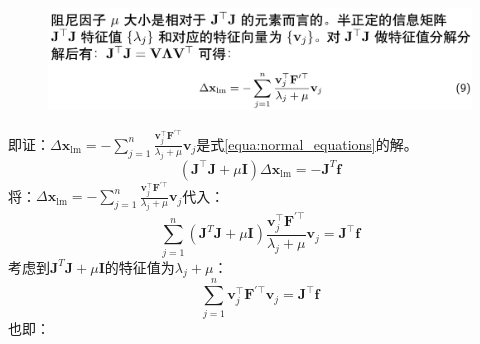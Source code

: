 \documentclass[oneside]{article}
\begin{document}
\begin{figure}[h]
    \centering
    \includegraphics[width=.8\linewidth]{figures/fig4.png}    
\end{figure}

即证：$\Delta \mathbf{x}_{\operatorname{lm}}=-\sum_{j=1}^{n} \frac{\mathbf{v}_{j}^{\top} \mathbf{F}^{\prime \top}}{\lambda_{j}+\mu} \mathbf{v}_{j}$是式\ref{equa:normal_equations}的解。
\begin{equation}
    (\mathbf{J}^\top\mathbf{J} + \mu \mathbf{I}) \Delta \mathbf{x}_{\operatorname{lm}} = - \mathbf{J} ^T  \mathbf{f}
    \label{equa:normal_equations}
\end{equation}
将：$\Delta \mathbf{x}_{\operatorname{lm}}=-\sum_{j=1}^{n} \frac{\mathbf{v}_{j}^{\top} \mathbf{F}^{\prime \top}}{\lambda_{j}+\mu} \mathbf{v}_{j}$代入：
\begin{equation}
    \sum_{j=1}^{n}(\mathbf{J}^T\mathbf{J} + \mu \mathbf{I})  \frac{\mathbf{v}_{j}^{\top} \mathbf{F}^{\prime \top}}{\lambda_{j}+\mu} \mathbf{v}_{j} = \mathbf{J} ^\top  \mathbf{f}
\end{equation}
考虑到$\mathbf{J}^T\mathbf{J} + \mu \mathbf{I}$的特征值为$\lambda_{j}+\mu$：
\begin{equation}
    \sum_{j=1}^{n} \mathbf{v}_{j}^{\top} \mathbf{F}^{\prime \top} \mathbf{v}_{j} = \mathbf{J} ^\top  \mathbf{f} 
\end{equation}
也即：
\end{document}
